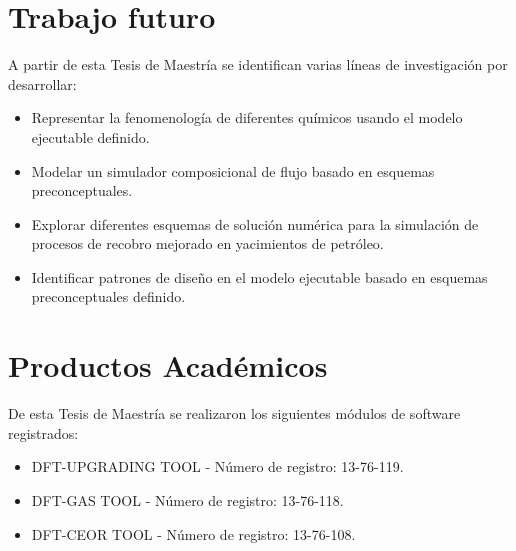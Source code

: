 \section{Trabajo futuro}

A partir de esta Tesis de Maestría se identifican varias líneas de investigación por desarrollar:

\begin{itemize}
	\item Representar la fenomenología de diferentes químicos usando el modelo ejecutable definido.
	\item Modelar un simulador composicional de flujo basado en esquemas preconceptuales.
	\item Explorar diferentes esquemas de solución numérica para la simulación de procesos de recobro mejorado en yacimientos de petróleo.
	\item Identificar patrones de diseño en el modelo ejecutable basado en esquemas preconceptuales definido.
\end{itemize}

\section{Productos Académicos}

De esta Tesis de Maestría se realizaron los siguientes módulos de software registrados:

\begin{itemize}
	\item DFT-UPGRADING TOOL - Número de registro: 13-76-119.
	\item DFT-GAS TOOL - Número de registro: 13-76-118.
	\item DFT-CEOR TOOL - Número de registro: 13-76-108.
\end{itemize}

